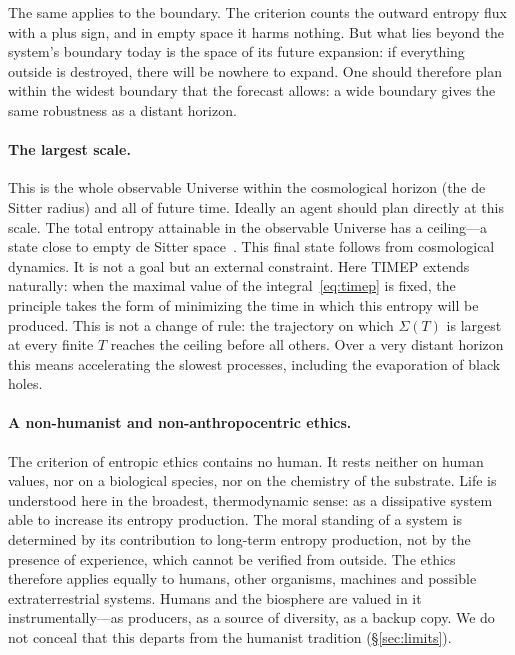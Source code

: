 \documentclass[11pt,a4paper]{article}
\newcommand{\Sref}[1]{\hyperref[#1]{\S\ref{#1}}}
\begin{document}
The same applies to the boundary. The criterion counts the outward entropy flux with a plus sign, and in empty space it harms nothing. But what lies beyond the system's boundary today is the space of its future expansion: if everything outside is destroyed, there will be nowhere to expand. One should therefore plan within the widest boundary that the forecast allows: a wide boundary gives the same robustness as a distant horizon.

\paragraph{The largest scale.}
This is the whole observable Universe within the cosmological horizon (the de Sitter radius) and all of future time. Ideally an agent should plan directly at this scale. The total entropy attainable in the observable Universe has a ceiling---a state close to empty de Sitter space~\cite{gibbons1977,egan2010}. This final state follows from cosmological dynamics. It is not a goal but an external constraint. Here TIMEP extends naturally: when the maximal value of the integral~\eqref{eq:timep} is fixed, the principle takes the form of minimizing the time in which this entropy will be produced. This is not a change of rule: the trajectory on which $\Sigma(T)$ is largest at every finite $T$ reaches the ceiling before all others. Over a very distant horizon this means accelerating the slowest processes, including the evaporation of black holes.

\paragraph{A non-humanist and non-anthropocentric ethics.}
The criterion of entropic ethics contains no human. It rests neither on human values, nor on a biological species, nor on the chemistry of the substrate. Life is understood here in the broadest, thermodynamic sense: as a dissipative system able to increase its entropy production. The moral standing of a system is determined by its contribution to long-term entropy production, not by the presence of experience, which cannot be verified from outside. The ethics therefore applies equally to humans, other organisms, machines and possible extraterrestrial systems. Humans and the biosphere are valued in it instrumentally---as producers, as a source of diversity, as a backup copy. We do not conceal that this departs from the humanist tradition (\Sref{sec:limits}).
\end{document}
